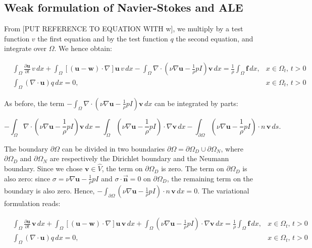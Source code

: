 \documentclass[11pt,a4paper,titlepage]{report}
\begin{document}
\subsection{Weak formulation of Navier-Stokes and ALE}


From [PUT REFERENCE TO EQUATION WITH w], we multiply by a test function $v$ the first equation and by the test function $q$ the second equation, and integrate over $\Omega$. We hence obtain:


\[
\begin{aligned}
& \int_{\Omega} \frac{\partial \mathbf{u}}{\partial t} \, v \, dx 
+ \int_{\Omega} [(\mathbf{u - w}) \cdot \nabla] \mathbf{u} \, v \, dx
- \int_{\Omega} \nabla \cdot (\nu \nabla \mathbf{u} -  \frac{1}{\rho}  pI)\mathbf{v} \, dx
=  \frac{1}{\rho} \int_{\Omega} \mathbf{f} \, dx,  & x \in \Omega_t, \, t>0 \\
& \int_{\Omega}  (\nabla \cdot \mathbf{u}) q \, dx = 0 , & x \in \Omega_t, \, t>0
\end{aligned}
\]


As before, the term $- \int_{\Omega} \nabla \cdot (\nu \nabla \mathbf{u} -   \frac{1}{\rho}  pI)\mathbf{v} \, dx$ can be integrated by parts:

\[
- \int_{\Omega} \nabla \cdot (\nu \nabla \mathbf{u} -  \frac{1}{\rho} pI)\mathbf{v} \, dx =  \int_{\Omega} (\nu \nabla \mathbf{u} -  \frac{1}{\rho}  pI) \cdot \nabla \mathbf{v} \, dx - \int_{\partial \Omega} (\nu \nabla \mathbf{u} -  \frac{1}{\rho}  pI) \cdot n \, \mathbf{v} \, ds.
\]

The boundary $\partial \Omega$ can be divided in two boundaries $ \partial \Omega = \partial \Omega_D \cup \partial \Omega_N $, where $\partial \Omega_D$ and $\partial \Omega_N$ are respectively the Dirichlet boundary and the Neumann boundary. 
Since we chose $\mathbf{v} \in \hat{V}$, the term on $\partial \Omega_{D}$ is zero. The term on $\partial \Omega_{D}$ is also zero: since $\sigma = \nu \nabla \mathbf{u} -  \frac{1}{\rho} pI$ and $\sigma \cdot \vec{\mathbf{n}} = 0$ on $\partial \Omega_{D}$, the remaining term on the boundary is also zero. Hence, $- \int_{\partial \Omega} (\nu \nabla \mathbf{u} -  \frac{1}{\rho}  pI) \cdot n \, \mathbf{v} \, dx = 0$. The variational formulation reads:

\[
\begin{aligned}
& \int_{\Omega} \frac{\partial \mathbf{u}}{\partial t} \, \mathbf{v} \, dx 
+ \int_{\Omega} [(\mathbf{u - w}) \cdot \nabla] \mathbf{u} \, \mathbf{v} \, dx
+ \int_{\Omega} (\nu \nabla \mathbf{u} -  \frac{1}{\rho}  pI) \cdot \nabla \mathbf{v} \, dx
=  \frac{1}{\rho} \int_{\Omega} \mathbf{f} \, dx,  & x \in \Omega_t, \, t>0 \\
& \int_{\Omega} ( \nabla \cdot \mathbf{u} ) q \, dx = 0 , & x \in \Omega_t, \, t>0
\end{aligned}
\]
\end{document}
